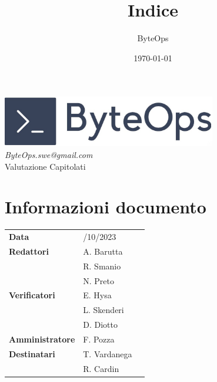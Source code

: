 \documentclass{article}
\title{\textbf{\fontsize{28}{6}\selectfont Indice}}
\author{\fontsize{14}{6}\selectfont ByteOps}
\date{\today}
\begin{document}
\pagestyle{fancy}
\begin{center}
\includegraphics[width = 0.7\textwidth]{../Images/logo.png} \\
\vspace{0.2cm}
\textcolor[RGB]{60, 60, 60}{\textit{ByteOps.swe@gmail.com}} \\
\vspace{2cm}
\fontsize{16}{6}\selectfont Valutazione Capitolati \\ 
\vspace{0.5cm}
\end{center}

\section*{Informazioni documento}
\def\arraystretch{1.2}
\begin{tabular}{>{\raggedleft\arraybackslash}p{}|>{\raggedright\arraybackslash}p{}c}
\hline
\addlinespace
    \textbf{Data} & 26/10/2023 \vspace{10pt} \\
    \textbf{Redattori} & A. Barutta \\ & R. Smanio \\ & N. Preto \vspace{10pt} \\
    \textbf{Verificatori} & E. Hysa \\ & L. Skenderi \\ & D. Diotto \vspace{10pt} \\
    \textbf{Amministratore} & F. Pozza \vspace{10pt} \\
    \textbf{Destinatari} & T. Vardanega \\ & R. Cardin \vspace{10pt} \\
\end{tabular}
\pagebreak 

\maketitle
\thispagestyle{fancy}
\tableofcontents
{}
\pagebreak
\end{document}
